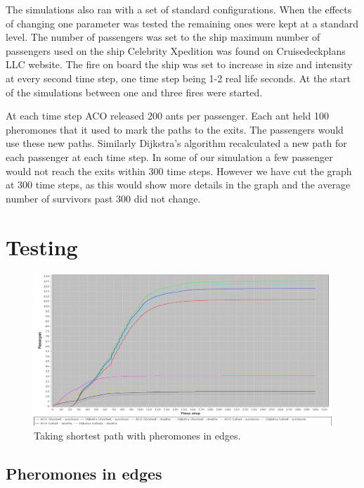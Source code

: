 The simulations also ran with a set of standard configurations. When the effects of changing one parameter was tested the remaining ones were kept at a standard level. The number of passengers was set to the ship maximum number of passengers used on the ship Celebrity Xpedition was found on Cruisedeckplans LLC website\cite{cruseships}. The fire on board the ship was set to increase in size and intensity at every second time step, one time step being 1-2 real life seconds. At the start of the simulations between one and three fires were started.

At each time step ACO released 200 ants per passenger. Each ant held 100 pheromones that it used to mark the paths to the exits. The passengers would use these new paths. Similarly Dijkstra's algorithm recalculated a new path for each passenger at each time step. In some of our simulation a few passenger would not reach the exits within 300 time steps. However we have cut the graph at 300 time steps, as this would show more details in the graph and the average number of survivors past 300 did not change. 


\section{Testing}

\begin{figure} [h]
\centering
\hspace*{-1.0in}
\includegraphics[scale=0.35]{images/Graph-using-200-rounds-140-passangers-and-ACO-having-pheremons-in-edges.png}
\caption{Taking shortest path with pheromones in edges.}
\label{fig:celebPherInEdge}
\end{figure}
\subsection{Pheromones in edges}

